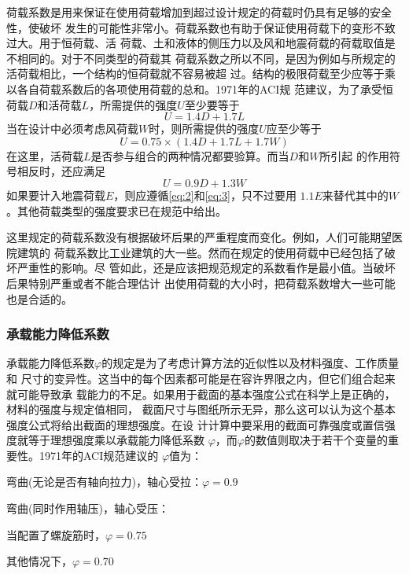 \documentclass[12pt,a4paper]{book}
\begin{document}
荷载系数是用来保证在使用荷载增加到超过设计规定的荷载时仍具有足够的安全性，使破坏
发生的可能性非常小。荷载系数也有助于保证使用荷载下的变形不致过大。用于恒荷载、活
荷载、土和液体的侧压力以及风和地震荷载的荷载取值是不相同的。对于不同类型的荷载其
荷载系数之所以不同，是因为例如与所规定的活荷载相比，一个结构的恒荷载就不容易被超
过。结构的极限荷载至少应等于乘以各自荷载系数后的各项使用荷载的总和。1971年的ACI规
范建议，为了承受恒荷载$D$和活荷载$L$，所需提供的强度$U$至少要等于
\begin{equation}
  \label{eq:1} U=1.4D+1.7L
\end{equation}当在设计中必须考虑风荷载$W$时，则所需提供的强度$U$应至少等于
\begin{equation}
  \label{eq:2} U=0.75\times(1.4D+1.7L+1.7W)
\end{equation}在这里，活荷载$L$是否参与组合的两种情况都要验算。而当$D$和$W$所引起
的作用符号相反时，还应满足
\begin{equation}
  \label{eq:3} U=0.9D+1.3W
\end{equation}如果要计入地震荷载$E$，则应遵循\cref{eq:2}和\cref{eq:3}，只不过要用
$1.1E$来替代其中的$W$。其他荷载类型的强度要求已在规范中给出。

这里规定的荷载系数没有根据破坏后果的严重程度而变化。例如，人们可能期望医院建筑的
荷载系数比工业建筑的大一些。然而在规定的使用荷载中已经包括了破坏严重性的影响。尽
管如此，还是应该把规范规定的系数看作是最小值。当破坏后果特别严重或者不能合理估计
出使用荷载的大小时，把荷载系数增大一些可能也是合适的。

\subsubsection{承载能力降低系数}

承载能力降低系数$\varphi$的规定是为了考虑计算方法的近似性以及材料强度、工作质量和
尺寸的变异性。这当中的每个因素都可能是在容许界限之内，但它们组合起来就可能导致承
载能力的不足。如果用于截面的基本强度公式在科学上是正确的，材料的强度与规定值相同，
截面尺寸与图纸所示无异，那么这可以认为这个基本强度公式将给出截面的理想强度。在设
计计算中要采用的截面可靠强度或置信强度就等于理想强度乘以承载能力降低系数
$\varphi$，而$\varphi$的数值则取决于若干个变量的重要性。1971年的ACI规范建议的
$\varphi$值为：

弯曲(无论是否有轴向拉力)，轴心受拉：$\varphi=0.9$

弯曲(同时作用轴压)，轴心受压：

当配置了螺旋筋时，$\varphi=0.75$

其他情况下，$\varphi=0.70$
\end{document}
